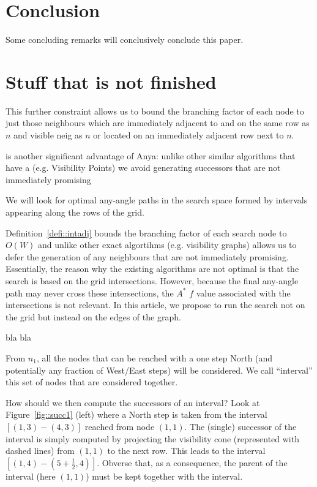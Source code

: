 \section{Conclusion}
Some concluding remarks will conclusively conclude this paper.

\section{Stuff that is not finished}
This further constraint allows us to bound the branching factor of each
node to just those neighbours which are immediately adjacent to and on
the same row as $n$ and visible neig
as $n$ or located on an immediately adjacent 
row next to $n$.

is another significant advantage of Anya: unlike other similar
algorithms that have a (e.g. Visibility Points) we avoid generating successors that 
are not immediately promising

We will look for optimal any-angle paths in the search space formed by
intervals appearing along the rows of the grid.
%

Definition~\ref{defi::intadj} bounds the branching factor of each 
search node to $O(W)$ and unlike other exact algortihms (e.g. visibility graphs)
allows us to defer the generation of any neighbours that are not 
immediately promising.
\\

Essentially, the reason why the existing algorithms are not optimal
is that the search is based on the grid intersections.  
However, because the final any-angle path 
may never cross these intersections, 
the $A^*$ $f$ value associated with the intersections
is not relevant.  
In this article, we propose to run the search not on the grid 
but instead on the edges of the graph.  

bla bla

From $n_1$, all the nodes that can be reached with a one step North 
(and potentially any fraction of West/East steps) will be considered.  
We call ``interval'' this set of nodes that are considered together.  

How should we then compute the successors of an interval?  
Look at Figure~\ref{fig::succ1} (left) 
where a North step is taken from the interval $[(1,3)-(4,3)]$
reached from node $(1,1)$.  
The (single) successor of the interval 
is simply computed by projecting the visibility cone 
(represented with dashed lines)
from $(1,1)$ to the next row.  
This leads to the interval $[(1,4)-(5+\frac{1}{2},4)]$.  
Obverse that, as a consequence, the parent of the interval 
(here $(1,1)$) must be kept together with the interval.  

